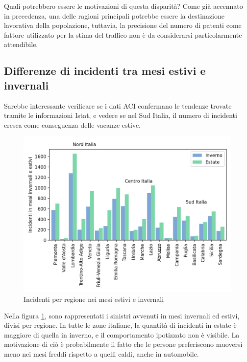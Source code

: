 \documentclass[a4paper,12pt]{report}
\begin{document}
Quali potrebbero essere le motivazioni di questa disparità?
Come già accennato in precedenza, una delle ragioni principali 
potrebbe essere la destinazione lavorativa della popolazione, tuttavia, 
la precisione del numero di patenti come fattore utilizzato per la stima 
del traffico non è da considerarsi particolarmente attendibile. 

\subsection{Differenze di incidenti tra mesi estivi e invernali}

Sarebbe interessante verificare se i dati ACI confermano le tendenze trovate tramite 
le informazioni Istat, e vedere se nel Sud Italia, il numero di incidenti cresca 
come conseguenza delle vacanze estive. 

\begin{figure}
    \includegraphics[width=\linewidth]{../src/incidenti/incidenti_aci/mappe_regioni/estate_inverno.png}
    \caption{Incidenti per regione nei mesi estivi e invernali}
    \label{fig:estate-inverno}
\end{figure}

Nella figura \ref{fig:estate-inverno}, sono rappresentati i sinistri avvenuti 
in mesi invernali ed estivi, divisi per regione. 
In tutte le zone italiane, la quantità di incidenti in estate è maggiore di quella 
in inverno, e il comportamento ipotizzato non è visibile. 
La motivazione di ciò è probabilmente il fatto che 
le persone preferiscono muoversi meno nei mesi freddi rispetto a quelli caldi, 
anche in automobile. 
\end{document}
